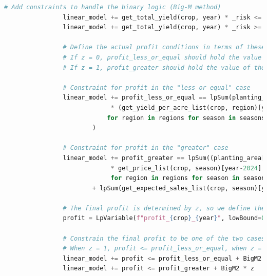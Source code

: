 \documentclass[withoutpreface]{cumcmthesis}
\begin{document}
\begin{appendices}
\begin{lstlisting}[language=python]
                # Add constraints to handle the binary logic (Big-M method)
                linear_model += get_total_yield(crop, year) * _risk <= get_expected_sales_list(crop, '第一季')[year-2024] + get_expected_sales_list(crop, '第二季')[year-2024] + BigM1 * (1 - z)
                linear_model += get_total_yield(crop, year) * _risk >= get_expected_sales_list(crop, '第一季')[year-2024] + get_expected_sales_list(crop, '第二季')[year-2024] - BigM1 * z
    
                # Define the actual profit conditions in terms of these auxiliary variables
                # If z = 0, profit_less_or_equal should hold the value of the first branch
                # If z = 1, profit_greater should hold the value of the second branch
    
                # Constraint for profit in the "less or equal" case
                linear_model += profit_less_or_equal == lpSum(planting_area[(crop, region, year, season)]
                             * (get_yield_per_acre_list(crop, region)[year-2024] * get_price_list(crop, season)[year-2024] * _risk * sup_coef(crop, region, year, season) - get_cost_list(crop, region)[year-2024])
                            for region in regions for season in seasons
                        )
    
                # Constraint for profit in the "greater" case
                linear_model += profit_greater == lpSum((planting_area[(crop, region, year, season)] * get_yield_per_acre_list(crop, region)[year-2024] * sup_coef(crop, region, year, season) - get_expected_sales_list(crop, season)[year-2024] - get_cost_list(crop, region)[year-2024])
                             * get_price_list(crop, season)[year-2024] * (1 - reduction_factor) 
                             for region in regions for season in seasons) \
                        + lpSum(get_expected_sales_list(crop, season)[year-2024] * get_price_list(crop, season)[year-2024] for season in seasons)
    
                # The final profit is determined by z, so we define the overall profit
                profit = LpVariable(f"profit_{crop}_{year}", lowBound=0)
    
                # Constrain the final profit to be one of the two cases
                # When z = 1, profit <= profit_less_or_equal, when z = 0, profit <= profit_greater
                linear_model += profit <= profit_less_or_equal + BigM2 * (1 - z)
                linear_model += profit <= profit_greater + BigM2 * z
    

\end{lstlisting}
\end{appendices}
\end{document}

